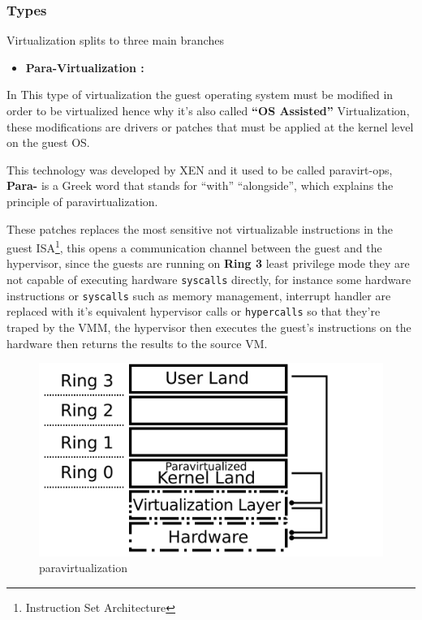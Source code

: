 \documentclass[
  14pt,
  english,
  a4paper,
]{scrreprt}
\providecommand{\tightlist}{%
  \setlength{\itemsep}{0pt}\setlength{\parskip}{0pt}}
\begin{document}
\hypertarget{types}{%
\subsubsection{Types}\label{types}}

Virtualization splits to three main branches

\begin{itemize}
\tightlist
\item
  \textbf{Para-Virtualization :}
\end{itemize}

In This type of virtualization the guest operating system must be
modified in order to be virtualized hence why it's also called
\textbf{``OS Assisted''} Virtualization, these modifications are drivers
or patches that must be applied at the kernel level on the guest OS.

This technology was developed by XEN and it used to be called
paravirt-ops, \textbf{Para-} is a Greek word that stands for ``with''
``alongside'', which explains the principle of paravirtualization.

These patches replaces the most sensitive not virtualizable instructions
in the guest ISA\footnote{Instruction Set Architecture}, this opens a
communication channel between the guest and the hypervisor, since the
guests are running on \textbf{Ring 3} least privilege mode they are not
capable of executing hardware \texttt{syscalls} directly, for instance
some hardware instructions or \texttt{syscalls} such as memory
management, interrupt handler are replaced with it's equivalent
hypervisor calls or \texttt{hypercalls} so that they're traped by the
VMM, the hypervisor then executes the guest's instructions on the
hardware then returns the results to the source VM.

\begin{figure}
\hypertarget{fig:paravirt}{%
\centering
\includegraphics[width=1\textwidth,height=\textheight]{figures/paravirtualization_diagram.png}
\caption{paravirtualization}\label{fig:paravirt}
}
\end{figure}
\end{document}
